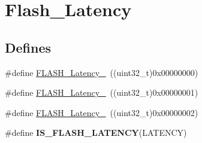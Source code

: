 \hypertarget{group__Flash__Latency}{
\section{Flash\_\-Latency}
\label{group__Flash__Latency}
}
\subsection*{Defines}
\begin{DoxyCompactItemize}
\item 
\#define \hyperlink{group__Flash__Latency_ga09afe6e52b819cc074f6111ec42ac3c3}{FLASH\_\-Latency\_}~((uint32\_\-t)0x00000000)
\item 
\#define \hyperlink{group__Flash__Latency_ga6b7281665340fe8f7919bdfcfd06f8e6}{FLASH\_\-Latency\_}~((uint32\_\-t)0x00000001)
\item 
\#define \hyperlink{group__Flash__Latency_ga55173ebb5c978459ce18d5e2516e3e89}{FLASH\_\-Latency\_}~((uint32\_\-t)0x00000002)
\item 
\#define {\bfseries IS\_\-FLASH\_\-LATENCY}(LATENCY)
\end{DoxyCompactItemize}


